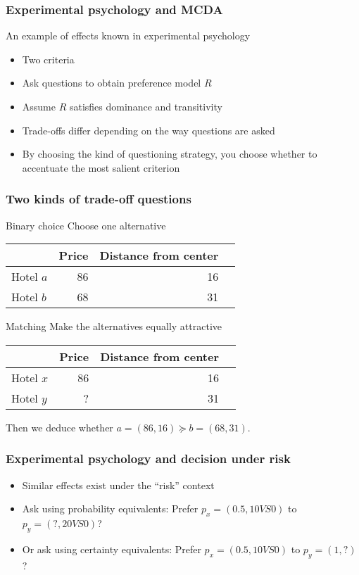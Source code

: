 \documentclass[french,english]{beamer}
\begin{document}
\begin{frame}
	\frametitle{Experimental psychology and MCDA}
	An example of effects known in experimental psychology
	\begin{itemize}
		\item Two criteria
		\item Ask questions to obtain preference model $R$
		\item Assume $R$ satisfies dominance and transitivity
		\item Trade-offs differ depending on the way questions are asked
		\item By choosing the kind of questioning strategy, you choose whether to accentuate the most salient criterion
	\end{itemize}
\end{frame}

\begin{frame}
	\frametitle{Two kinds of trade-off questions}
	\begin{block}{Binary choice}
		Choose one alternative
		\begin{center}
			\begin{tabular}{lrrl}
					& Price	& Distance from center\\
				\hline
				Hotel $a$	& 86	& 16\\
				Hotel $b$	& 68	& 31\\
				\hline
			\end{tabular}
		\end{center}
	\end{block}
	\begin{block}{Matching}
		Make the alternatives equally attractive
		\begin{center}
			\begin{tabular}{lrrl}
					& Price	& Distance from center\\
				\hline
				Hotel $x$	& 86	& 16\\
				Hotel $y$	& ?	& 31\\
				\hline
			\end{tabular}
		\end{center}
		Then we deduce whether $a=(86, 16) \succeq b=(68, 31)$.
	\end{block}
\end{frame}

\begin{frame}
	\frametitle{Experimental psychology and decision under risk}
	\begin{itemize}
		\item Similar effects exist under the “risk” context
		\item Ask using probability equivalents: Prefer $p_x = (0.5, 10 VS 0)$ to $p_y = (?, 20 VS 0)$?
		\item Or ask using certainty equivalents: Prefer $p_x = (0.5, 10 VS 0)$ to $p_y = (1, ?)$?
	\end{itemize}
\end{frame}
\end{document}
